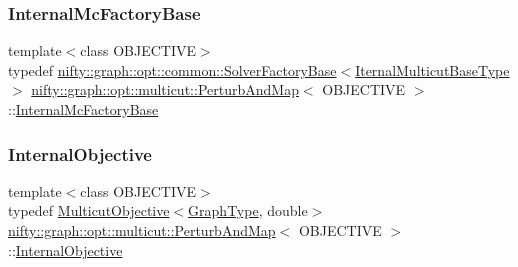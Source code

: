 \mbox{\label{classnifty_1_1graph_1_1opt_1_1multicut_1_1PerturbAndMap_ae247bf7bd80c2621db557e828198b4f0}} 
\subsubsection{\texorpdfstring{Internal\+Mc\+Factory\+Base}{InternalMcFactoryBase}}
{\footnotesize\ttfamily template$<$class O\+B\+J\+E\+C\+T\+I\+VE$>$ \\
typedef \hyperlink{classnifty_1_1graph_1_1opt_1_1common_1_1SolverFactoryBase}{nifty\+::graph\+::opt\+::common\+::\+Solver\+Factory\+Base}$<$\hyperlink{classnifty_1_1graph_1_1opt_1_1multicut_1_1PerturbAndMap_a42bd629f5bdb2d60985e551861c70a4f}{Iternal\+Multicut\+Base\+Type}$>$ \hyperlink{classnifty_1_1graph_1_1opt_1_1multicut_1_1PerturbAndMap}{nifty\+::graph\+::opt\+::multicut\+::\+Perturb\+And\+Map}$<$ O\+B\+J\+E\+C\+T\+I\+VE $>$\+::\hyperlink{classnifty_1_1graph_1_1opt_1_1multicut_1_1PerturbAndMap_ae247bf7bd80c2621db557e828198b4f0}{Internal\+Mc\+Factory\+Base}}

\mbox{\label{classnifty_1_1graph_1_1opt_1_1multicut_1_1PerturbAndMap_abf4a3ad796a3a06f4e488880cadc7fc9}} 
\subsubsection{\texorpdfstring{Internal\+Objective}{InternalObjective}}
{\footnotesize\ttfamily template$<$class O\+B\+J\+E\+C\+T\+I\+VE$>$ \\
typedef \hyperlink{classnifty_1_1graph_1_1opt_1_1multicut_1_1MulticutObjective}{Multicut\+Objective}$<$\hyperlink{classnifty_1_1graph_1_1opt_1_1multicut_1_1PerturbAndMap_a4284b4d29c3e770b0e107fa794b3d32e}{Graph\+Type}, double$>$ \hyperlink{classnifty_1_1graph_1_1opt_1_1multicut_1_1PerturbAndMap}{nifty\+::graph\+::opt\+::multicut\+::\+Perturb\+And\+Map}$<$ O\+B\+J\+E\+C\+T\+I\+VE $>$\+::\hyperlink{classnifty_1_1graph_1_1opt_1_1multicut_1_1PerturbAndMap_abf4a3ad796a3a06f4e488880cadc7fc9}{Internal\+Objective}}

